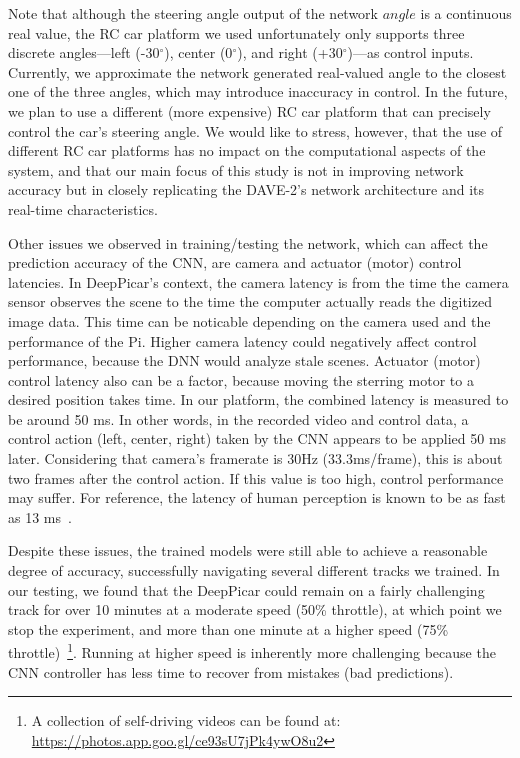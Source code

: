 Note that although the steering angle output of the network $angle$ is
a continuous real value, the RC car platform we used unfortunately
only supports three discrete angles---left (-30$^{\circ}$), center
(0$^{\circ}$), and right (+30$^{\circ}$)---as control inputs.
Currently, we approximate the network generated real-valued
angle to the closest one of the three angles, which may
introduce inaccuracy in control.
In the future, we plan to use a different (more expensive) RC car
platform that can precisely control the car's steering angle.
We would like to stress, however, that the use of different RC car
platforms has no impact on the computational 
aspects of the system, and that our main focus of this study is
not in improving network accuracy but in closely replicating the
DAVE-2's network architecture and its real-time characteristics.

Other issues we observed in training/testing the network, which
can affect the prediction accuracy of the CNN, are camera and actuator
(motor) control latencies. In DeepPicar's
context, the camera latency is from the time the camera
sensor observes the scene to the time the computer actually reads the
digitized image data. This time can be noticable depending on the camera 
used and the performance of the Pi. Higher camera latency could
negatively affect control performance, because the DNN would analyze
stale scenes. Actuator (motor) control latency also can be a
factor, because moving the sterring motor to a desired position takes
time. 
In our platform, the combined latency is measured to be around
50 ms. In other words, in the recorded video and control data, a
control action (left, center, right) taken by the CNN appears to be
applied 50 ms later. Considering that camera's framerate is 30Hz
(33.3ms/frame), this is about two frames after the control action.
If this value is too high, control performance may suffer. 
For reference, the latency of human perception is known to be as fast
as 13 ms~\cite{ThomasBurger2015}.

Despite these issues, the trained models were still able to
achieve a reasonable degree of accuracy, successfully navigating
several different tracks we trained. In our testing, we found that the
DeepPicar could remain on a fairly challenging track for over 10
minutes at a moderate speed (50\% throttle), at which point we stop
the experiment, and more than one minute at a higher speed (75\%
throttle)~\footnote{A collection of self-driving videos can be found
  at: \url{https://photos.app.goo.gl/ce93sU7jPk4ywO8u2}}. Running at
higher speed is inherently more challenging because the CNN controller
has less time to recover from mistakes (bad predictions).
